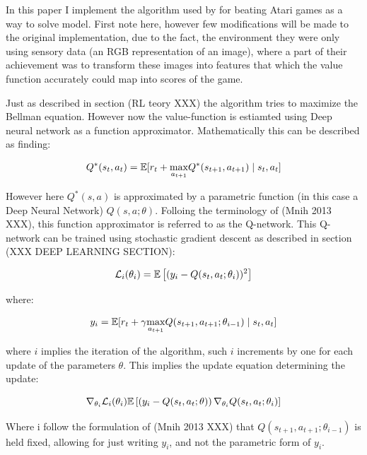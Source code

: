 In this paper I implement the algorithm used by \parencite{mnih_playing_nodate} for beating Atari games as a way to solve model. First note here, however few modifications will be made to the original implementation, due to the fact, the environment they were only using sensory data (an RGB representation of an image), where a part of their achievement was to transform these images into features that which the value function accurately could map into scores of the game. 

Just as described in section (RL teory XXX) the algorithm tries to maximize the Bellman equation. However now the value-function is estiamted using Deep neural network as a function approximator. Mathematically this can be described as finding:

\begin{equation}
    Q^*(s_t,a_t) = \mathbb{E} [r_t + \underset{a_{t+1}}{\max}  Q^*(s_{t+1}, a_{t+1}) \mid s_t, a_t]
\end{equation}

However here $Q^*(s, a)$ is approximated by a parametric function (in this case a Deep Neural Network) $Q(s, a ; \theta)$. Folloing the terminology of (Mnih 2013 XXX), this function approximator is referred to as the Q-network. This Q-network can be trained using stochastic gradient descent as described in section (XXX DEEP LEARNING SECTION):

\begin{equation}
    \mathcal{L}_i(\theta_i) = \mathbb{E} \left[ (y_i - Q(s_t, a_t ; \theta_i))^2 \right]
\end{equation}

where:

\begin{equation}
    y_i = \mathbb{E} [r_t + \gamma \underset{a_{t+1}}\max Q(s_{t+1}, a_{t+1}; \theta_{i-1}) \mid s_t, a_t ]
\end{equation}

where $i$ implies the iteration of the algorithm, such $i$ increments by one for each update of the parameters $\theta$. This implies the update equation determining the update:

\begin{equation}
    \nabla_{\theta_i} \mathcal{L}_i (\theta_i)  \mathbb{E} \left[ \left( y_i - Q(s_t, a_t ; \theta) \right) \nabla_{\theta_i} Q(s_t, a_t; \theta_i) \right]
\end{equation}

Where i follow the formulation of (Mnih 2013 XXX) that $Q(s_{t+1}, a_{t+1}; \theta_{i-1})$ is held fixed, allowing for just writing $y_i$, and not the parametric form of $y_i$.

